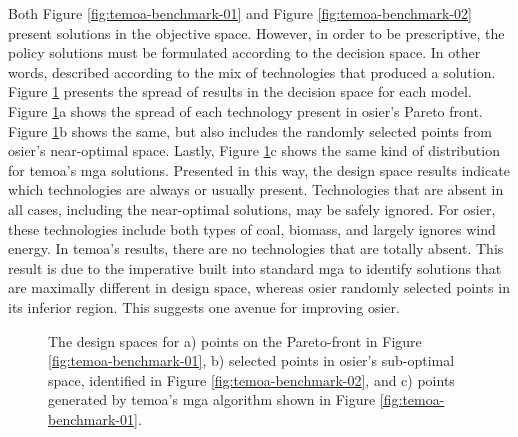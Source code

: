 Both Figure \ref{fig:temoa-benchmark-01} and Figure \ref{fig:temoa-benchmark-02}
present solutions in the objective space. However, in order to be prescriptive,
the policy solutions must be formulated according to the decision space. In
other words, described according to the mix of technologies that produced a
solution. Figure \ref{fig:temoa-benchmark-03} presents the spread of results in
the decision space for each model. Figure \ref{fig:temoa-benchmark-03}a shows
the spread of each technology present in \ac{osier}'s Pareto front. Figure
\ref{fig:temoa-benchmark-03}b shows the same, but also includes the randomly
selected points from \ac{osier}'s near-optimal space. Lastly, Figure
\ref{fig:temoa-benchmark-03}c shows the same kind of distribution for
\ac{temoa}'s \ac{mga} solutions. Presented in this way, the design space results
indicate which technologies are always or usually present. Technologies that are
absent in all cases, including the near-optimal solutions, may be safely
ignored. For \ac{osier}, these technologies include both types of coal, biomass,
and largely ignores wind energy. In \ac{temoa}'s results, there are no
technologies that are totally absent. This result is due to the imperative built
into standard \ac{mga} to identify solutions that are maximally different in
design space, whereas \ac{osier} randomly selected points in its inferior
region. This suggests one avenue for improving \ac{osier}.

\newpage
\begin{figure}[ht!]
  \centering
  \resizebox{\columnwidth}{!}{}
  \caption{The design spaces for a) points on the Pareto-front in Figure
  \ref{fig:temoa-benchmark-01}, b) selected points in \ac{osier}'s sub-optimal
  space, identified in Figure \ref{fig:temoa-benchmark-02}, and c) points
  generated by \ac{temoa}'s \ac{mga} algorithm shown in Figure
  \ref{fig:temoa-benchmark-01}.}
  \label{fig:temoa-benchmark-03}
\end{figure}

 
\FloatBarrier